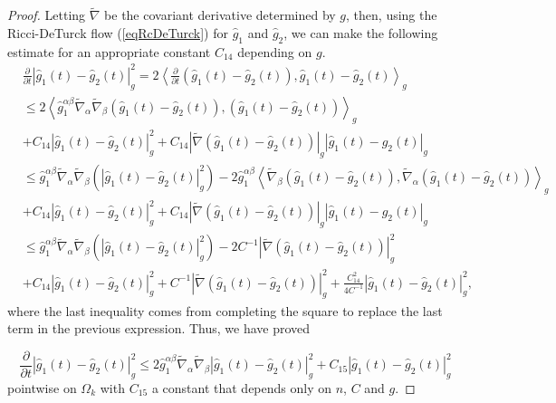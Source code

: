 \begin{proof}
Letting $\tilde \nabla$ be the covariant derivative determined by
$g$, then, using the Ricci-DeTurck flow (\ref{eqRcDeTurck}) for
$\hat g_1$ and $\hat g_2$, we can  make the following estimate for
an appropriate constant $C_{14}$ depending on $g$.
\begin{align*}
& \frac{\partial}{\partial t}\left\vert \hat g_1(  t) -\hat g_2( t)
\right\vert _{g}^{2} =2\left\langle \frac{\partial}{\partial
t}\left(  \hat g_1(  t) -\hat g_2( t)  \right) ,\hat g_1( t)
-\hat g_2(  t)  \right\rangle _{g}   \\
& \leq 2\left\langle\hat
g_1^{\alpha\beta}\tilde{\nabla}_{\alpha}\tilde{\nabla}_{\beta}\left(
\hat g_1(t)-\hat g_2(t)\right),  \left(  \hat g_1( t) -\hat g_2(t)
\right)\right\rangle_g
\\ &  +C_{14}\left\vert \hat g_1(  t)  -\hat g_2(
t) \right\vert _{g}^{2}  +C_{14}\left\vert \tilde\nabla\left( \hat
g_1( t) - \hat g_2( t)\right)  \right\vert _{g} \left\vert \hat g_1(
t)
-\hat g_2(  t)  \right\vert _{g}\\
& \leq \hat
g_1^{\alpha\beta}\tilde{\nabla}_{\alpha}\tilde{\nabla}_{\beta}\left(\left\vert
\hat g_1(  t)  -\hat g_2(  t)  \right\vert _{g}^{2}\right) -2\hat
g_1^{\alpha\beta}\left\langle\tilde{\nabla}_{\beta}\left( \hat
g_1(t)-\hat g_2(t)\right),\tilde{\nabla}_{\alpha}\left(  \hat g_1(
t)  -\hat g_2 (t)  \right)\right\rangle_g \\
&  +C_{14}\left\vert \hat g_1(t)-\hat g_2(t) \right\vert _{g}^{2}
+C_{14}\left\vert \tilde\nabla\left(  \hat g_1(t)-\hat g_2(t)
\right) \right\vert
_{g}\left\vert \hat g_1(t) - \hat g_2(t)\right\vert _{g}\\
&  \leq   \hat
g_1^{\alpha\beta}\tilde{\nabla}_{\alpha}\tilde{\nabla}_{\beta}\left(\left\vert
\hat g_1\left(  t\right)  -\hat g_2\left(  t\right)  \right\vert
_{g}^{2}\right)-2C^{-1}  \left\vert \tilde\nabla\left( \hat
g_1(t)-\hat g_2(t)\right)
\right\vert _{g}^{2}\\
&  +C_{14}\left\vert \hat g_1(t)-\hat g_2(t)\right\vert
_{g}^{2}+C^{-1} \left\vert \tilde\nabla\left( \hat g_1(t)-\hat
g_2(t) \right) \right\vert _{g}^{2}+\frac{C_{14}^{2}}{4C^{-1}
}\left\vert \hat g_1(t)-\hat g_2(t) \right\vert _{g}^{2},
\end{align*}
where the last inequality comes from completing the square to
replace the last term in the previous expression. Thus, we have
proved

\begin{equation}
\frac{\partial}{\partial t}\left\vert \hat g_1\left(  t\right) -\hat
g_2\left( t\right) \right\vert _{g}^{2}\leq 2 \hat
g_1^{\alpha\beta}\tilde{\nabla}_{\alpha}
\tilde{\nabla}_{\beta}\left\vert \hat g_1\left(  t\right)  -\hat
g_2\left( t\right) \right\vert _{g}^{2}+C_{15}\left\vert \hat
g_1\left( t\right)  -\hat g_2\left( t\right)  \right\vert _{g}^{2}
\label{eqestforunique}
\end{equation}
pointwise on $\Omega_{k}$ with $C_{15}$ a constant that depends only
on $n$, $C$ and $g$.


\end{proof}
